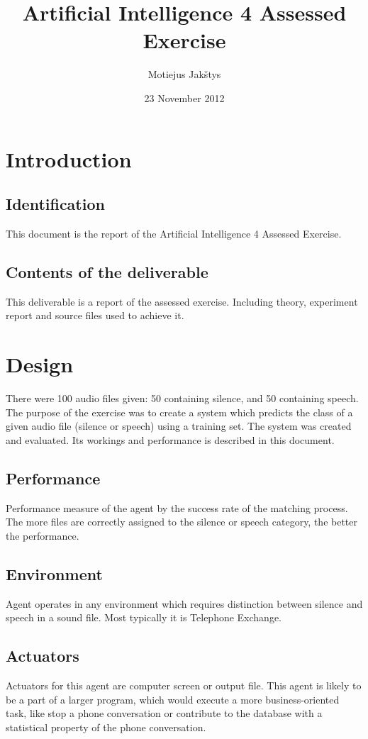 \documentclass[english,11pt]{article}
\numberwithin{equation}{section}
\begin{document}
\title{Artificial Intelligence 4 Assessed Exercise}
\author{Motiejus Jakštys}
\date{23 November 2012}

\maketitle
\pagebreak
\tableofcontents
\pagebreak

\section{Introduction}
\subsection{Identification}
This document is the report of the Artificial Intelligence 4 Assessed
Exercise.

\subsection{Contents of the deliverable}
This deliverable is a report of the assessed exercise. Including theory,
experiment report and source files used to achieve it.

\section{Design}
There were 100 audio files given: 50 containing silence, and 50 containing
speech. The purpose of the exercise was to create a system which predicts the
class of a given audio file (silence or speech) using a training set. The
system was created and evaluated. Its workings and performance is described in
this document.

\subsection{Performance}
Performance measure of the agent by the success rate of the matching
process. The more files are correctly assigned to the silence or speech
category, the better the performance.

\subsection{Environment}
Agent operates in any environment which requires distinction between silence
and speech in a sound file. Most typically it is Telephone Exchange.

\subsection{Actuators}
Actuators for this agent are computer screen or output file. This agent is
likely to be a part of a larger program, which would execute a more
business-oriented task, like stop a phone conversation or contribute to the
database with a statistical property of the phone conversation.
\end{document}
